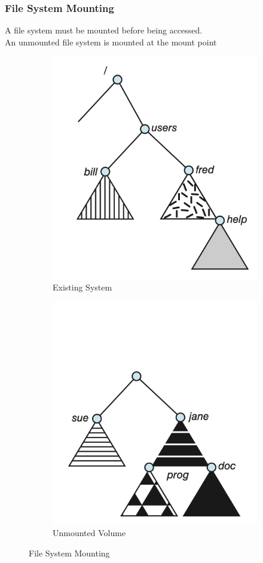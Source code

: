 \documentclass{book/custombook}
\begin{document}
                    \subsubsection{File System Mounting}
                        A file system must be mounted before being accessed.\\
                        An unmounted file system is mounted at the mount point
                        \begin{figure}[H]
                            \centering
                            \begin{subfigure}{0.5\linewidth}
                                \centering
                                \includegraphics[width=0.6\linewidth]{figures/existing_system.png}
                                \caption{Existing System}
                            \end{subfigure}%
                            \begin{subfigure}{0.5\linewidth}
                                \centering
                                \includegraphics[width=0.6\linewidth]{figures/unmounted_volume.png}
                                \caption{Unmounted Volume}
                            \end{subfigure}
                            \caption{File System Mounting}
                        \end{figure}
\end{document}
